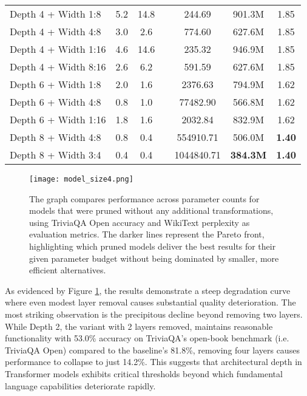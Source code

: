 {\begin{table}[!htbp]
\begin{tabular}{lcccccc}
Depth 4 + Width 1:8 & 5.2 & 14.8 & & 244.69 & 901.3M & 1.85 \\
Depth 4 + Width 4:8 & 3.0 & 2.6 & & 774.60 & 627.6M & 1.85 \\
Depth 4 + Width 1:16 & 4.6 & 14.6 & & 235.32 & 946.9M & 1.85 \\
Depth 4 + Width 8:16 & 2.6 & 6.2 & & 591.59 & 627.6M & 1.85 \\
Depth 6 + Width 1:8 & 2.0 & 1.6 & & 2376.63 & 794.9M & 1.62 \\
Depth 6 + Width 4:8 & 0.8 & 1.0 & & 77482.90 & 566.8M & 1.62 \\
Depth 6 + Width 1:16 & 1.8 & 1.6 & & 2032.84 & 832.9M & 1.62 \\
Depth 8 + Width 4:8 & 0.8 & 0.4 & & 554910.71 & 506.0M & \textbf{1.40} \\
Depth 8 + Width 3:4 & 0.4 & 0.4 & & 1044840.71 & \textbf{384.3M} & \textbf{1.40} \\

\hline
\end{tabular}
\end{table}
}



\begin{figure}[!htbp]
    \centering
    \texttt{[image: model\_size4.png]}
    \caption[Comparison of Pruned Models]{The graph compares performance across parameter counts for models that were pruned without any additional transformations, using TriviaQA Open accuracy and WikiText perplexity as evaluation metrics. The darker lines represent the Pareto front, highlighting which pruned models deliver the best results for their given parameter budget without being dominated by smaller, more efficient alternatives.}
    \label{fig:graph_size}
\end{figure}

As evidenced by Figure \ref{fig:graph_size}, the results demonstrate a steep degradation curve where even modest layer removal causes substantial quality deterioration. The most striking observation is the precipitous decline beyond removing two layers. While Depth 2, the variant with 2 layers removed, maintains reasonable functionality with 53.0\% accuracy on TriviaQA's open-book benchmark (i.e. TriviaQA Open) compared to the baseline's 81.8\%, removing four layers causes performance to collapse to just 14.2\%. This suggests that architectural depth in Transformer models exhibits critical thresholds beyond which fundamental language capabilities deteriorate rapidly.

